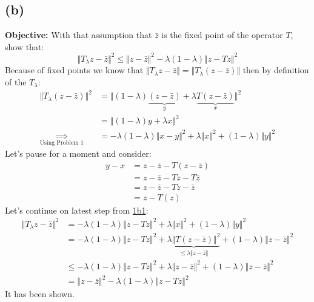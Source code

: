 \documentclass[]{article}
\begin{document}
    \subsection*{(b)}
        \textbf{Objective:} With that assumption that $\bar{z}$ is the fixed point of the operator $T$, show that: 
        $$
            \Vert T_\lambda z - \bar{z}\Vert^2 
            \le
            \Vert z - \bar{z}\Vert^2 
            -
            \lambda(1 - \lambda) \Vert z - Tz\Vert^2
        $$
        Because of fixed points we know that $\Vert T_\lambda z - \bar{z}\Vert = \Vert T_\lambda(z - \bar{z})\Vert$ then by definition of the $T_\lambda$: 
        \begin{align*}\tag{1b1}\label{eqn:1b1}
            \Vert T_\lambda(z - \bar{z}) \Vert^2
            &= 
            \Vert (1 - \lambda)
                \underbrace{(z - \bar{z})}_{y} + \lambda 
                \underbrace{T(z - \bar{z})}_{x}
            \Vert^2
            \\
            &= \Vert (1 - \lambda)y + \lambda x \Vert^2
            \\
            \underset{\text{Using Problem 1}}{\implies}
            &= - \lambda(1 - \lambda) \Vert x - y\Vert^2 + \lambda \Vert x\Vert^2 + (1 - \lambda)\Vert y\Vert^2
        \end{align*}
        Let's pause for a moment and consider: 
        \begin{align*}\tag{2b2}\label{eqn:2b2}
            y - x &= z - \bar{z} - T(z - \bar{z})
            \\ 
            &=z - \bar{z} - Tz - T\bar{z} 
            \\
            &= z - \bar{z} - Tz - \bar{z} 
            \\
            &= z - T(z)
        \end{align*}
        Let's continue on latest step from \hyperref[eqn:1b1]{1b1}: 
        \begin{align*}\tag{1b3}\label{eqn:1b3}
            \Vert T_\lambda z - \bar{z}\Vert^2
            &=-\lambda(1 - \lambda) \Vert z - Tz\Vert^2 
            + 
            \lambda \Vert x\Vert^2 + (1 - \lambda)\Vert y\Vert^2
            \\
            &= 
            -\lambda(1 - \lambda) \Vert z - Tz\Vert^2 
            + 
            \underbrace{\lambda \Vert T(z - \bar{z})\Vert^2}_{\le\lambda \Vert z - \bar{z}\Vert}
            + (1 - \lambda)
            \Vert z - \bar{z}\Vert^2
            \\
            &\le 
            -\lambda(1 - \lambda) \Vert z - Tz\Vert^2 
            + \lambda \Vert z - \bar{z}\Vert^2 + (1 - \lambda)\Vert z - \bar{z}\Vert^2
            \\
            &= 
            \Vert z - \bar{z}\Vert^2 -\lambda(1 - \lambda) \Vert z - Tz\Vert^2 
        \end{align*}
        It has been shown. 
\end{document}
